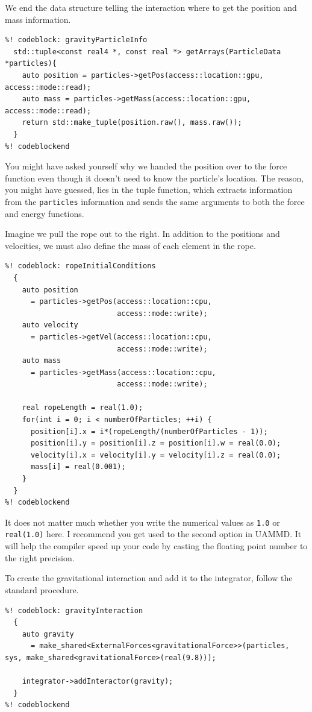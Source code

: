 We end the data structure telling the interaction where to get the position and
mass information.
\begin{lstlisting}
%! codeblock: gravityParticleInfo
  std::tuple<const real4 *, const real *> getArrays(ParticleData *particles){
    auto position = particles->getPos(access::location::gpu, access::mode::read);
    auto mass = particles->getMass(access::location::gpu, access::mode::read);
    return std::make_tuple(position.raw(), mass.raw());
  }
%! codeblockend
\end{lstlisting}
You might have asked yourself why we handed the position over to the force
function even though it doesn't need to know the particle's location. The reason,
you might have guessed, lies in the tuple function, which extracts information
from the \texttt{particles} information and sends the same arguments to both the
force and energy functions.

Imagine we pull the rope out to the right. In addition to the positions and
velocities, we must also define the mass of each element in the rope.
\begin{lstlisting}
%! codeblock: ropeInitialConditions
  {
    auto position
      = particles->getPos(access::location::cpu,
                          access::mode::write);
    auto velocity
      = particles->getVel(access::location::cpu,
                          access::mode::write);
    auto mass
      = particles->getMass(access::location::cpu,
                          access::mode::write);

    real ropeLength = real(1.0);
    for(int i = 0; i < numberOfParticles; ++i) {
      position[i].x = i*(ropeLength/(numberOfParticles - 1));
      position[i].y = position[i].z = position[i].w = real(0.0);
      velocity[i].x = velocity[i].y = velocity[i].z = real(0.0);
      mass[i] = real(0.001);
    }
  }
%! codeblockend
\end{lstlisting}
It does not matter much whether you write the numerical values as \texttt{1.0}
or \texttt{real(1.0)} here. I recommend you get used to the second option in
UAMMD. It will help the compiler speed up your code by casting the floating
point number to the right precision.

To create the gravitational interaction and add it to the integrator, follow the
standard procedure.
\begin{lstlisting}
%! codeblock: gravityInteraction
  {
    auto gravity
      = make_shared<ExternalForces<gravitationalForce>>(particles, sys, make_shared<gravitationalForce>(real(9.8)));

    integrator->addInteractor(gravity);
  }
%! codeblockend
\end{lstlisting}

